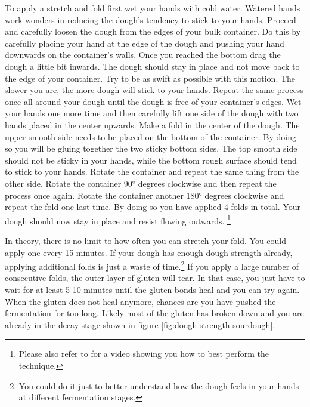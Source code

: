 To apply a stretch and fold first wet your hands with cold water. Watered hands
work wonders in reducing the dough's tendency to stick to your hands. Proceed and
carefully loosen the dough from the edges of your bulk container. Do this by
carefully placing your hand at the edge of the dough and pushing your hand
downwards on the container's walls. Once you reached the bottom drag the dough
a little bit inwards. The dough should stay in place and not move back to the
edge of your container. Try to be as swift as possible with this motion. The
slower you are, the more dough will stick to your hands. Repeat the same process
once all around your dough until the dough is free of your container's edges.
Wet your hands one more time and then carefully lift one side of the dough with
two hands placed in the center upwards. Make a fold in the center of the dough.
The upper smooth side needs to be placed on the bottom of the container. By doing
so you will be gluing together the two sticky bottom sides. The top smooth side should
not be sticky in your hands, while the bottom rough surface should tend
to stick to your hands.  Rotate the container
and repeat the same thing from the other side. Rotate the container 90° degrees
clockwise and then repeat the process once again. Rotate the container another 180° degrees clockwise
and repeat the fold one last time. By doing so you have applied 4 folds in total. Your
dough should now stay in place and resist flowing outwards.
\footnote{Please also refer to \cite{stretch+and+fold+technique} for a video showing
you how to best perform the technique.}

In theory, there is no limit to how often you can stretch your fold. You could
apply one every 15 minutes. If your dough has enough dough strength already,
applying additional folds is just a waste of time.\footnote{You could do it just to better understand how the
dough feels in your hands at different fermentation stages.} If you apply a
large number of consecutive folds, the outer layer of gluten
will tear. In that case, you just have to wait for at least 5-10 minutes until
the gluten bonds heal and you can try again. When the gluten does not heal
anymore, chances are you have pushed the fermentation for too long. Likely
most of the gluten has broken down and you are already
in the decay stage shown in figure \ref{fig:dough-strength-sourdough}.

